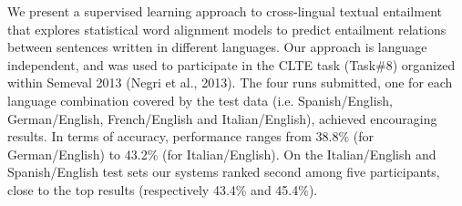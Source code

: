 We present a supervised learning approach to cross-lingual textual entailment that explores statistical word alignment models to predict entailment relations
 between sentences written in different languages. Our approach is language
 independent, and was used to participate in the CLTE task (Task\#8) organized
 within Semeval 2013 (Negri et al., 2013). The four runs submitted, one for each
 language combination covered by the test data (i.e. Spanish/English,
 German/English, French/English and Italian/English), achieved encouraging
 results. In terms of accuracy, performance ranges from 38.8\% (for
 German/English) to 43.2\% (for Italian/English). On the Italian/English and
 Spanish/English test sets our systems ranked second among five participants,
 close to the top results (respectively 43.4\% and 45.4\%).

